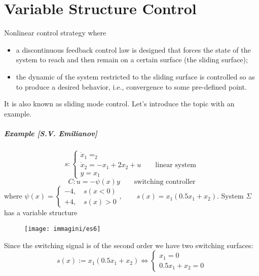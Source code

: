 \chapter{Variable Structure Control}
Nonlinear control strategy where
\begin{itemize}
\item a discontinuous feedback control law is designed that forces the state of the system to reach and then remain on a certain surface (the sliding surface);
\item the dynamic of the system restricted to the sliding surface is controlled so as to produce a desired behavior, i.e., convergence to some pre-defined point.
\end{itemize}
It is also known as sliding mode control. Let's introduce the topic with an example.
\paragraph{Example [S.V. Emilianov]}
\[
s:\begin{cases}
	\dot{x}_1=_2\\
	\dot{x}_2=-x_1+2x_2+u\qquad \text{linear system}\\
	y=x_1
\end{cases}
\]
\[
C:u=-\psi(x)y\qquad \text{switching controller}
\]where $\psi(x)=\begin{cases}
	-4,\quad s(x<0)\\
	+4,\quad s(x)>0
\end{cases},\qquad s(x)=x_1(0.5x_1+x_2)$.
System $\Sigma$ has a variable structure
\begin{figure}[H]
	\centering
	\texttt{[image: immagini/es6]}
	\caption{}
	\label{fig:es6}
\end{figure}
Since the switching signal is of the second order we have two switching surfaces:
\[
s(x):=x_1(0.5x_1+x_2) \Leftrightarrow \begin{cases}
	x_1=0\\0.5x_1+x_2=0
\end{cases}
\]

